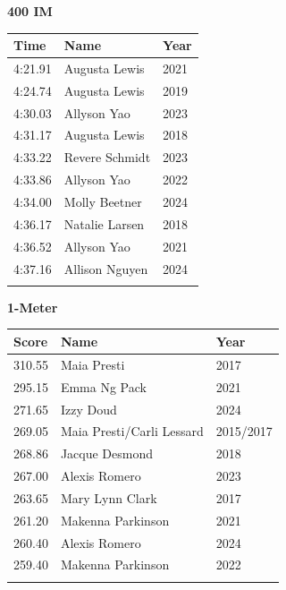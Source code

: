 \vspace{1.2em}
\noindent\begin{minipage}[t]{0.48\textwidth}
\centering
\textbf{\textcolor{teamprimary}{400 IM}}\par
\vspace{0.5em}
\centering
\small
\renewcommand{\arraystretch}{1.0}
\setlength{\tabcolsep}{4pt}
\begin{tabular}{@{}p{1.8cm}p{3.0cm}p{1.0cm}@{}}
\toprule
\textbf{Time} & \textbf{Name} & \textbf{Year} \\
\midrule
4:21.91 & Augusta Lewis & 2021 \\
4:24.74 & Augusta Lewis & 2019 \\
4:30.03 & Allyson Yao & 2023 \\
4:31.17 & Augusta Lewis & 2018 \\
4:33.22 & Revere Schmidt & 2023 \\
4:33.86 & Allyson Yao & 2022 \\
4:34.00 & Molly Beetner & 2024 \\
4:36.17 & Natalie Larsen & 2018 \\
4:36.52 & Allyson Yao & 2021 \\
4:37.16 & Allison Nguyen & 2024 \\
\bottomrule
\vspace{0.5em}
\end{tabular}
\end{minipage}
\hfill
\begin{minipage}[t]{0.48\textwidth}
\centering
\textbf{\textcolor{teamprimary}{1-Meter}}\par
\vspace{0.5em}
\centering
\small
\renewcommand{\arraystretch}{1.0}
\setlength{\tabcolsep}{4pt}
\begin{tabular}{@{}p{1.8cm}p{3.0cm}p{1.0cm}@{}}
\toprule
\textbf{Score} & \textbf{Name} & \textbf{Year} \\
\midrule
310.55 & Maia Presti & 2017 \\
295.15 & Emma Ng Pack & 2021 \\
271.65 & Izzy Doud & 2024 \\
269.05 & Maia Presti/Carli Lessard & 2015/2017 \\
268.86 & Jacque Desmond & 2018 \\
267.00 & Alexis Romero & 2023 \\
263.65 & Mary Lynn Clark & 2017 \\
261.20 & Makenna Parkinson & 2021 \\
260.40 & Alexis Romero & 2024 \\
259.40 & Makenna Parkinson & 2022 \\
\bottomrule
\vspace{0.5em}
\end{tabular}
\end{minipage}
